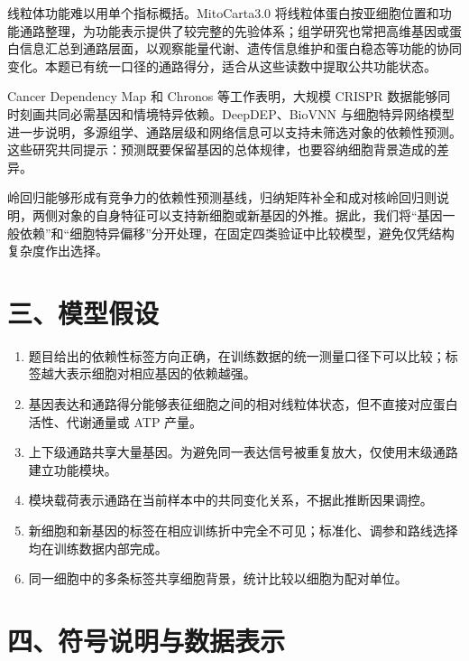 线粒体功能难以用单个指标概括。MitoCarta3.0 将线粒体蛋白按亚细胞位置和功能通路整理，为功能表示提供了较完整的先验体系\cite{ref4}；组学研究也常把高维基因或蛋白信息汇总到通路层面，以观察能量代谢、遗传信息维护和蛋白稳态等功能的协同变化\cite{ref6,ref7,ref8}。本题已有统一口径的通路得分，适合从这些读数中提取公共功能状态。

Cancer Dependency Map 和 Chronos 等工作表明，大规模 CRISPR 数据能够同时刻画共同必需基因和情境特异依赖\cite{ref2,ref3}。DeepDEP、BioVNN 与细胞特异网络模型进一步说明，多源组学、通路层级和网络信息可以支持未筛选对象的依赖性预测\cite{ref17,ref18,ref19}。这些研究共同提示：预测既要保留基因的总体规律，也要容纳细胞背景造成的差异。

岭回归能够形成有竞争力的依赖性预测基线\cite{ref9}，归纳矩阵补全和成对核岭回归则说明，两侧对象的自身特征可以支持新细胞或新基因的外推\cite{ref10,ref11,ref12}。据此，我们将``基因一般依赖''和``细胞特异偏移''分开处理，在固定四类验证中比较模型，避免仅凭结构复杂度作出选择。

\hypertarget{ux4e09ux6a21ux578bux5047ux8bbe}{%
\section{三、模型假设}\label{ux4e09ux6a21ux578bux5047ux8bbe}}

\begin{enumerate}
\def\labelenumi{\arabic{enumi}.}
\tightlist
\item
  题目给出的依赖性标签方向正确，在训练数据的统一测量口径下可以比较；标签越大表示细胞对相应基因的依赖越强。
\item
  基因表达和通路得分能够表征细胞之间的相对线粒体状态，但不直接对应蛋白活性、代谢通量或 ATP 产量。
\item
  上下级通路共享大量基因。为避免同一表达信号被重复放大，仅使用末级通路建立功能模块。
\item
  模块载荷表示通路在当前样本中的共同变化关系，不据此推断因果调控。
\item
  新细胞和新基因的标签在相应训练折中完全不可见；标准化、调参和路线选择均在训练数据内部完成。
\item
  同一细胞中的多条标签共享细胞背景，统计比较以细胞为配对单位。
\end{enumerate}

\hypertarget{ux56dbux7b26ux53f7ux8bf4ux660eux4e0eux6570ux636eux8868ux793a}{%
\section{四、符号说明与数据表示}\label{ux56dbux7b26ux53f7ux8bf4ux660eux4e0eux6570ux636eux8868ux793a}}

